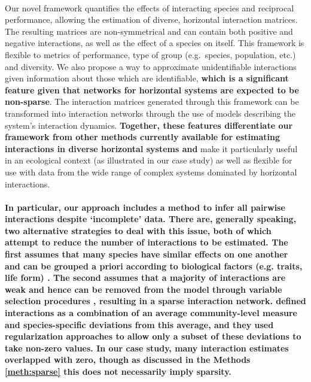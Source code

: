 \documentclass[a4,12pt]{article}
\begin{document}
\begin{refsection}
    \paragraph{} 
    Our novel framework quantifies the effects of interacting species and reciprocal performance, allowing the estimation of diverse, horizontal interaction matrices. The resulting matrices are non-symmetrical and can contain both positive and negative interactions, as well as the effect of a species on itself. This framework is flexible to metrics of performance, type of group (e.g.\ species, population, etc.) and diversity. We also propose a way to approximate unidentifiable interactions given information about those which are identifiable, \textbf{which is a significant feature given that networks for horizontal systems are expected to be non-sparse}. The interaction matrices generated through this framework can be transformed into interaction networks through the use of models describing the system's interaction dynamics. \textbf{Together, these features differentiate our framework from other methods currently available for estimating interactions in diverse horizontal systems and} make it particularly useful in an ecological context (as illustrated in our case study) as well as flexible for use with data from the wide range of complex systems dominated by horizontal interactions.

    \paragraph{}
    \textbf{In particular, our approach includes a method to infer all pairwise interactions despite `incomplete' data. There are, generally speaking, two alternative strategies to deal with this issue, both of which attempt to reduce the number of interactions to be estimated. The first assumes that many species have similar effects on one another and can be grouped a priori according to biological factors (e.g. traits, life form) \parencite{Uriarte2004, Martyn2020}. The second assumes that a majority of interactions are weak and hence can be removed from the model through variable selection procedures \parencite{Mutshinda2009, Weiss-Lehman2022}, resulting in a sparse interaction network. \textcite{Weiss-Lehman2022} defined interactions as a combination of an average community-level measure and species-specific deviations from this average, and they used regularization approaches to allow only a subset of these deviations to take non-zero values. In our case study, many interaction estimates overlapped with zero, though as discussed in the Methods \ref{meth:sparse} this does not necessarily imply sparsity.}


\end{refsection}
\end{document}

